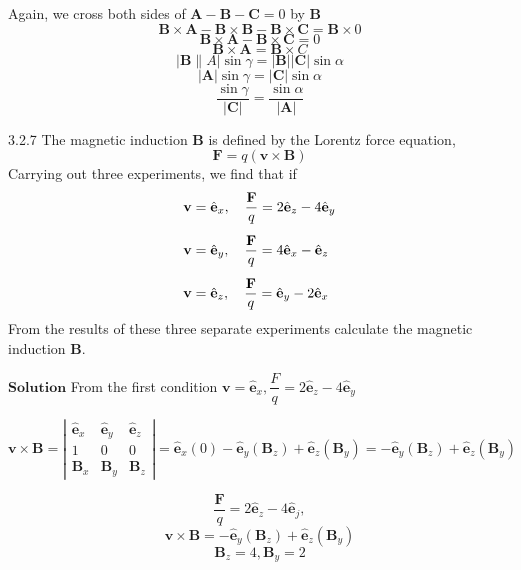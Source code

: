 \documentclass{styles/kaobook}
\begin{document}
Again, we cross both sides of $\mathbf{A}-\mathbf{B}-\mathbf{C}=0$ by $\mathbf{B}$
$$\mathbf{B} \times \mathbf{A}-\mathbf{B} \times \mathbf{B}-\mathbf{B} \times \mathbf{C}=\mathbf{B} \times 0$$
$$ \mathbf{B} \times \mathbf{A}-\mathbf{B} \times \mathbf{C}=0$$
$$ \mathbf{B} \times \mathbf{A}=\mathbf{B} \times C$$
$$|\mathbf{B} \| A| \sin \gamma=|\mathbf{B}||\mathbf{C}| \sin \alpha$$
$$|\mathbf{A}| \sin \gamma=|\mathbf{C}| \sin \alpha$$
$$ \frac{\sin \gamma}{|\mathbf{C}|}=\frac{\sin \alpha}{|\mathbf{A}|} $$






\begin{greenbox}{3.2.7}
The magnetic induction $\mathbf{B}$ is defined by the Lorentz force equation,
$$
\mathbf{F}=q(\mathbf{v} \times \mathbf{B})
$$
Carrying out three experiments, we find that if
$$
\begin{array}{l}{\mathbf{v}=\hat{\mathbf{e}}_{x}, \quad \dfrac{\mathbf{F}}{q}=2 \hat{\mathbf{e}}_{z}-4 \hat{\mathbf{e}}_{y}}\vspace{3mm} \\ {\mathbf{v}=\hat{\mathbf{e}}_{y}, \quad \dfrac{\mathbf{F}}{q}=4 \hat{\mathbf{e}}_{x}-\hat{\mathbf{e}}_{z}} \vspace{3mm}\\ {\mathbf{v}=\hat{\mathbf{e}}_{z}, \quad \dfrac{\mathbf{F}}{q}=\hat{\mathbf{e}}_{y}-2 \hat{\mathbf{e}}_{x}}\end{array}
$$
From the results of these three separate experiments calculate the magnetic induction $\mathbf{B}$.
\end{greenbox}



$\boxed{\textbf{Solution}}$ From the first condition $\mathbf{v}=\hat{\mathbf{e}}_{x}, \dfrac{F}{q}=2 \hat{\mathbf{e}}_{z}-4 \hat{\mathbf{e}}_{\dot{y}}$

$$
\mathbf{v} \times \mathbf{B}=\left|\begin{array}{ccc}
\hat{\mathbf{e}}_{x} & \hat{\mathbf{e}}_{y} & \hat{\mathbf{e}}_{z} \\
1 & 0 & 0 \\
\mathbf{B}_{x} & \mathbf{B}_{y} & \mathbf{B}_{z}
\end{array}\right|=\hat{\mathbf{e}}_{x}(0)-\hat{\mathbf{e}}_{y}\left(\mathbf{B}_{z}\right)+\hat{\mathbf{e}}_{z}\left(\mathbf{B}_{y}\right)=-\hat{\mathbf{e}}_{y}\left(\mathbf{B}_{z}\right)+\hat{\mathbf{e}}_{z}\left(\mathbf{B}_{y}\right)
$$

$$\frac{\mathbf{F}}{q}=2 \hat{\mathbf{e}}_{z}-4 \hat{\mathbf{e}}_{j},$$
$$ \mathbf{v} \times \mathbf{B}=-\hat{\mathbf{e}}_{y}\left(\mathbf{B}_{z}\right)+\hat{\mathbf{e}}_{z}\left(\mathbf{B}_{y}\right)$$
$$\mathbf{B}_{z}=4, \mathbf{B}_{y}=2$$
\end{document}
